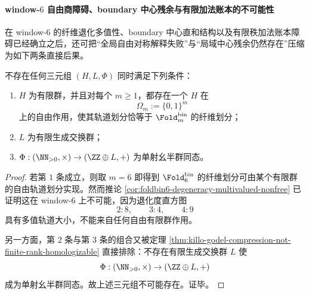 \paragraph{window-\texorpdfstring{$6$}{6} 自由商障碍、boundary 中心残余与有限加法账本的不可能性}
在 window-\(6\) 的纤维退化多值性、boundary 中心直和结构以及有限秩加法账本障碍已经确立之后，还可把“全局自由对称解释失败”与“局域中心残余仍然存在”压缩为如下两条直接后果。

\begin{theorem}[自由对称解释与有限加法账本的联合不可能性]\label{thm:xi-time-part60ab3-free-symmetry-finite-ledger-impossible}
不存在任何三元组 \((H,L,\Phi)\) 同时满足下列条件：
\begin{enumerate}
  \item \(H\) 为有限群，并且对每个 \(m\ge 1\)，都存在一个 \(H\) 在
  \[
  \Omega_m:=\{0,1\}^m
  \]
  上的自由作用，使其轨道划分恰等于 \(\Fold_m^{\mathrm{bin}}\) 的纤维划分；
  \item \(L\) 为有限生成交换群；
  \item \(\Phi:(\NN_{>0},\times)\to(\ZZ\oplus L,+)\) 为单射幺半群同态。
\end{enumerate}
\end{theorem}
\begin{proof}
若第 \(1\) 条成立，则取 \(m=6\) 即得到 \(\Fold_6^{\mathrm{bin}}\) 的纤维划分可由某个有限群的自由轨道划分实现。然而推论 \ref{cor:foldbin6-degeneracy-multivalued-nonfree} 已证明这在 window-\(6\) 上不可能，因为退化度直方图
\[
2:8,\qquad 3:4,\qquad 4:9
\]
具有多值轨道大小，不能来自任何自由有限群作用。

另一方面，第 \(2\) 条与第 \(3\) 条的组合又被定理 \ref{thm:killo-godel-compression-not-finite-rank-homologizable} 直接排除：不存在有限生成交换群 \(L\) 使
\[
\Phi:(\NN_{>0},\times)\to(\ZZ\oplus L,+)
\]
成为单射幺半群同态。故上述三元组不可能存在。证毕。
\end{proof}

